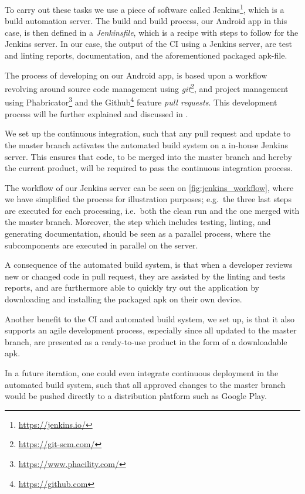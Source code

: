 To carry out these tasks we use a piece of software called Jenkins\footnote{\url{https://jenkins.io/}}, which is a build automation server.
The build and build process, our Android app in this case, is then defined in a \textit{Jenkinsfile}, which is a recipe with steps to follow for the Jenkins server.
In our case, the output of the \acl{CI} using a Jenkins server, are test and linting reports, documentation, and the aforementioned packaged apk-file.

The process of developing on our Android app, is based upon a workflow revolving around source code management using \textit{git}\footnote{\url{https://git-scm.com/}}, and project management using Phabricator\footnote{\url{https://www.phacility.com/}} and the Github\footnote{\url{https://github.com}} feature \textit{pull requests}.
This development process will be further explained and discussed in .

We set up the continuous integration, such that any pull request and update to the master branch activates the automated build system on a in-house Jenkins server.
This ensures that code, to be merged into the master branch and hereby the current product, will be required to pass the continuous integration process.

The workflow of our Jenkins server can be seen on \cref{fig:jenkins_workflow}, where we have simplified the process for illustration purposes; e.g.~the three last steps are executed for each processing, i.e.~both the clean run and the one merged with the master branch.
Moreover, the step which includes testing, linting, and generating documentation, should be seen as a parallel process, where the subcomponents are executed in parallel on the server.



A consequence of the automated build system, is that when a developer reviews new or changed code in pull request, they are assisted by the linting and tests reports, and are furthermore able to quickly try out the application by downloading and installing the packaged apk on their own device.

\bigskip
Another benefit to the \acl{CI} and automated build system, we set up, is that it also supports an agile development process, especially since all updated to the master branch, are presented as a ready-to-use product in the form of a downloadable apk.

In a future iteration, one could even integrate continuous deployment in the automated build system, such that all approved changes to the master branch would be pushed directly to a distribution platform such as Google Play.

